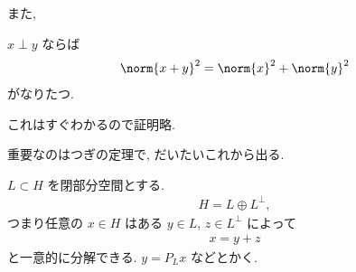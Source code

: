 \documentclass[openany, a4paper, oneside]{jsbook}
\begin{document}
また,
\begin{prop}[ピタゴラスの定理]
$x \perp y$ ならば
\begin{align}
 \norm{x + y}^2
 =
 \norm{x}^2 + \norm{y}^2
\end{align}
がなりたつ.
\end{prop}
これはすぐわかるので証明略.

重要なのはつぎの定理で, だいたいこれから出る.
\begin{thm}[射影定理]
 $L \subset H$ を閉部分空間とする.
 \begin{align}
  H
  =
  L \oplus L^{\perp},
 \end{align}
 つまり任意の $x \in H$ はある $y \in L$, $z \in L^{\perp}$ によって
 \begin{align}
  x = y + z
 \end{align}
 と一意的に分解できる.
 $y = P_Lx$ などとかく.
\end{thm}
\end{document}
